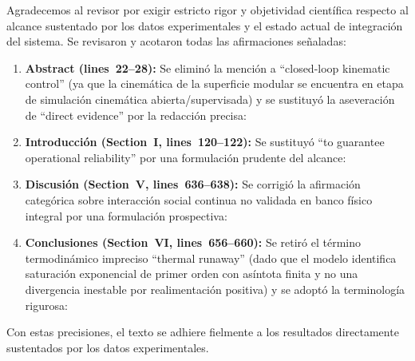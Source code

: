 \documentclass{LabDSTresponse}
\begin{document}
{Agradecemos al revisor por exigir estricto rigor y objetividad científica respecto al alcance sustentado por los datos experimentales y el estado actual de integración del sistema. Se revisaron y acotaron todas las afirmaciones señaladas:
\begin{enumerate}
    \item \textbf{Abstract (lines~22--28):} Se eliminó la mención a “closed-loop kinematic control” (ya que la cinemática de la superficie modular se encuentra en etapa de simulación cinemática abierta/supervisada) y se sustituyó la aseveración de “direct evidence” por la redacción precisa:
    \item \textbf{Introducción (Section~I, lines~120--122):} Se sustituyó “to guarantee operational reliability” por una formulación prudente del alcance:
    \item \textbf{Discusión (Section~V, lines~636--638):} Se corrigió la afirmación categórica sobre interacción social continua no validada en banco físico integral por una formulación prospectiva:
    \item \textbf{Conclusiones (Section~VI, lines~656--660):} Se retiró el término termodinámico impreciso “thermal runaway” (dado que el modelo identifica saturación exponencial de primer orden con asíntota finita y no una divergencia inestable por realimentación positiva) y se adoptó la terminología rigurosa:
\end{enumerate}
Con estas precisiones, el texto se adhiere fielmente a los resultados directamente sustentados por los datos experimentales.}
\end{document}
